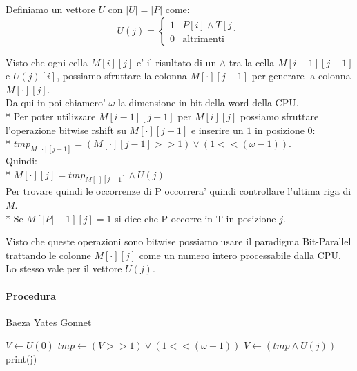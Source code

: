 Definiamo un vettore $U$ con $|U| = |P|$ come:
\[
    U(j) = 
    \begin{cases}
        1 & \text{$P[i] \land T[j]$} \\
        0 & \text{altrimenti}
    \end{cases}
\]

Visto che ogni cella $M[i][j]$ e' il risultato di un $\land$ tra la cella $M[i-1][j-1]$ e $U(j)[i]$, possiamo sfruttare la colonna $M[\cdot][j-1]$ per generare la colonna $M[\cdot][j]$. \\

Da qui in poi chiamero' $\omega$ la dimensione in bit della word della CPU. \\*
Per poter utilizzare $M[i-1][j-1]$ per $M[i][j]$ possiamo sfruttare l'operazione bitwise rshift su $M[\cdot][j-1]$ e inserire un $1$ in posizione $0$: \\*
$tmp_{M[\cdot][j-1]} = (M[\cdot][j-1] >> 1) \lor (1 << (\omega - 1))$. \\

Quindi: \\*
$M[\cdot][j] = tmp_{M[\cdot][j-1]} \land U(j)$ \\

Per trovare quindi le occorrenze di P occorrera' quindi controllare l'ultima riga di $M$. \\*
Se $M[|P| - 1][j] = 1$ si dice che P occorre in T in posizione $j$.

Visto che queste operazioni sono bitwise possiamo usare il paradigma Bit-Parallel trattando le colonne $M[\cdot][j]$ come un numero intero processabile dalla CPU. Lo stesso vale per il vettore $U(j)$.

\paragraph{Procedura}

\begin{algorithm}
   \renewcommand\thealgorithm{}
   \caption{Baeza Yates Gonnet}
   \begin{algorithmic}
            \State $V \gets U(0)$
                \State $tmp \gets (V >> 1) \lor (1 << (\omega - 1))$
                \State $V \gets (tmp \land U(j))$
                    \State print(j)
                \EndIf
            \EndFor
        \EndProcedure
    \end{algorithmic}
\end{algorithm}


